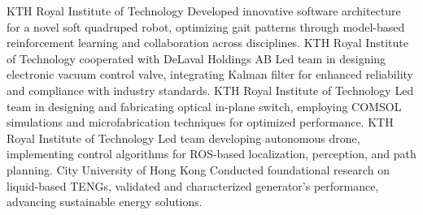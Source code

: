 \documentclass{my_cv}
\begin{document}
\begin{multicols}{2}
%
    {KTH Royal Institute of Technology}%
    {Developed innovative software architecture for a novel soft quadruped robot, optimizing gait patterns through model-based reinforcement learning and collaboration across disciplines.}
%
    {KTH Royal Institute of Technology cooperated with DeLaval Holdings AB}%
    {Led team in designing electronic vacuum control valve, integrating Kalman filter for enhanced reliability and compliance with industry standards.}
%
    {KTH Royal Institute of Technology}%
    {Led team in designing and fabricating optical in-plane switch, employing COMSOL simulations and microfabrication techniques for optimized performance.}%
%
    {KTH Royal Institute of Technology}%
    {Led team developing autonomous drone, implementing control algorithms for ROS-based localization, perception, and path planning.}%
%
    {City University of Hong Kong}%
    {Conducted foundational research on liquid-based TENGs, validated and characterized generator's performance, advancing sustainable energy solutions.}%

\end{multicols}
\end{document}
